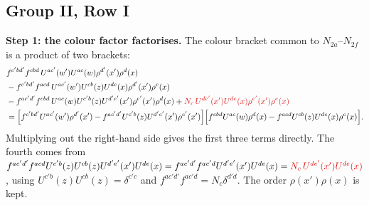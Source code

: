 \documentclass[9pt]{article}
\newcommand{\R}[1]{{\color{cR}#1}}
\numberwithin{equation}{section}
\begin{document}
\subsection{Group II, Row I}
\textbf{Step 1: the colour factor factorises.} The colour bracket common to $N_{2a}$--$N_{2f}$ is a product of two brackets:
\begin{align}
&f^{c'bd'}f^{cbd}\,U^{ac'}(w')U^{ac}(w)\rho^{d'}(x')\rho^{d}(x)\notag\\
&-f^{c'bd'}f^{acd}\,U^{ac'}(w')U^{cb}(z)U^{de}(x)\rho^{d'}(x')\rho^{e}(x)\notag\\
&-f^{ac'd'}f^{cbd}\,U^{ac}(w)U^{c'b}(z)U^{d'e'}(x')\rho^{e'}(x')\rho^{d}(x)+\R{N_{c}\,U^{de'}(x')U^{de}(x)\rho^{e'}(x')\rho^{e}(x)}\notag\\
&=\Big[f^{c'bd'}U^{ac'}(w')\rho^{d'}(x')-f^{ac'd'}U^{c'b}(z)U^{d'e'}(x')\rho^{e'}(x')\Big]\Big[f^{cbd}U^{ac}(w)\rho^{d}(x)-f^{acd}U^{cb}(z)U^{de}(x)\rho^{e}(x)\Big].
\end{align}
Multiplying out the right-hand side gives the first three terms directly. The fourth comes from $f^{ac'd'}f^{acd}U^{c'b}(z)U^{cb}(z)U^{d'e'}(x')U^{de}(x)=f^{ac'd'}f^{ac'd}U^{d'e'}(x')U^{de}(x)=\R{N_{c}\,U^{de'}(x')U^{de}(x)}$, using $U^{c'b}(z)U^{cb}(z)=\delta^{c'c}$ and $f^{ac'd'}f^{ac'd}=N_{c}\delta^{d'd}$. The order $\rho(x')\rho(x)$ is kept.
\end{document}
